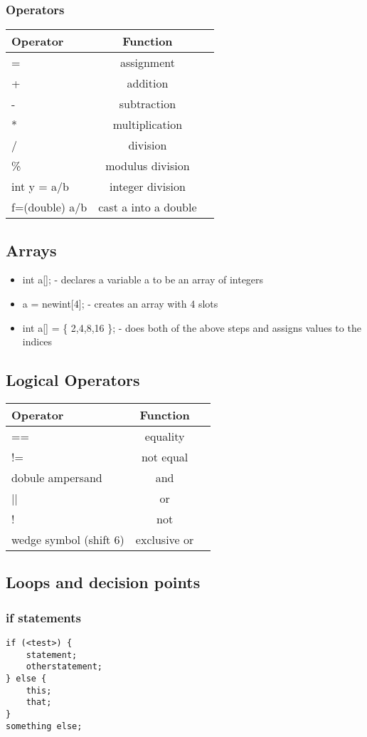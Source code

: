 \documentclass[a4paper,11pt]{article}
\theoremstyle{mytheor}
\begin{document}
\subsubsection*{Operators}
\begin{tabular}{l|cc}
  Operator& Function & \\
  \hline
  = & assignment & \\
  + & addition &\\
  - & subtraction &\\
  * & multiplication &\\
  / & division &\\
  \% & modulus division &\\
  int y = a/b & integer division &\\
  f=(double) a/b & cast a into a double &
\end{tabular}

\subsection*{Arrays}
\begin{itemize}
\item int a[]; - declares a variable a to be an array of integers
\item a = newint[4]; - creates an array with 4 slots
\item int a[] = \{ 2,4,8,16 \}; - does both of the above steps and assigns values to the indices
\end{itemize}

\subsection*{Logical Operators}
\begin{tabular}{l|cc}
  Operator& Function & \\
  \hline
  == & equality & \\
  != & not equal &\\
  dobule ampersand & and &\\
  || & or &\\
   ! & not &\\
   wedge symbol (shift 6) & exclusive or &
\end{tabular}

\subsection*{Loops and decision points}
\subsubsection*{if statements}
\begin{lstlisting}
if (<test>) {
    statement;
    otherstatement;
} else {
    this;
    that;
}
something else;
\end{lstlisting}
\end{document}
